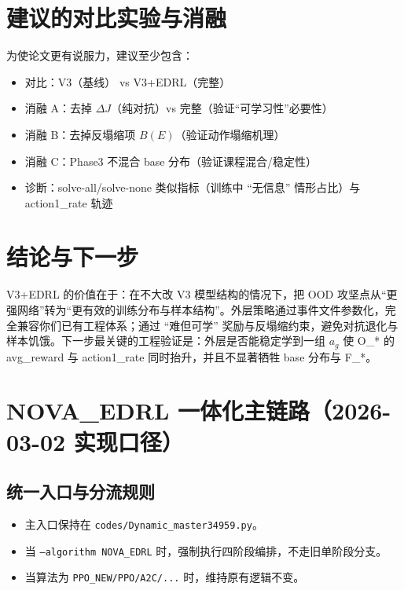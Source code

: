 \documentclass[UTF8,11pt,a4paper]{ctexart}
\begin{document}
\section{建议的对比实验与消融}
为使论文更有说服力，建议至少包含：
\begin{itemize}
\item 对比：V3（基线） vs V3+EDRL（完整）
\item 消融 A：去掉 $\Delta J$（纯对抗）\;vs\; 完整（验证``可学习性''必要性）
\item 消融 B：去掉反塌缩项 $B(E)$（验证动作塌缩机理）
\item 消融 C：Phase3 不混合 base 分布（验证课程混合/稳定性）
\item 诊断：solve-all/solve-none 类似指标（训练中 ``无信息'' 情形占比）与 action1\_rate 轨迹
\end{itemize}

\section{结论与下一步}
V3+EDRL 的价值在于：在不大改 V3 模型结构的情况下，把 OOD 攻坚点从``更强网络''转为``更有效的训练分布与样本结构''。外层策略通过事件文件参数化，完全兼容你们已有工程体系；通过 ``难但可学'' 奖励与反塌缩约束，避免对抗退化与样本饥饿。下一步最关键的工程验证是：外层是否能稳定学到一组 $a_g$ 使 O\_* 的 avg\_reward 与 action1\_rate 同时抬升，并且不显著牺牲 base 分布与 F\_*。

\section{NOVA\_EDRL 一体化主链路（2026-03-02 实现口径）}
\subsection{统一入口与分流规则}
\begin{itemize}
\item 主入口保持在 \texttt{codes/Dynamic\_master34959.py}。
\item 当 \texttt{--algorithm NOVA\_EDRL} 时，强制执行四阶段编排，不走旧单阶段分支。
\item 当算法为 \texttt{PPO\_NEW/PPO/A2C/...} 时，维持原有逻辑不变。
\end{itemize}
\end{document}
